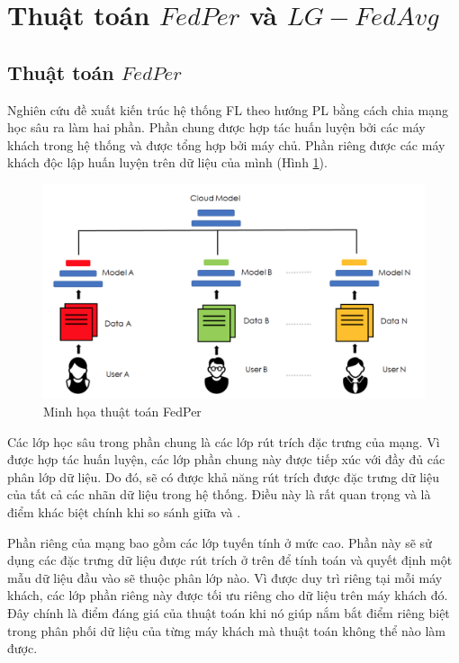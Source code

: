 \section{Thuật toán $FedPer$ và $LG-FedAvg$}


\subsection{Thuật toán $FedPer$}

Nghiên cứu \cite{arivazhagan2019federated} đề xuất kiến trúc hệ thống FL theo hướng PL bằng cách chia mạng học sâu ra làm hai phần. Phần chung được hợp tác huấn luyện bởi các máy khách trong hệ thống và được tổng hợp bởi máy chủ. Phần riêng được các máy khách độc lập huấn luyện trên dữ liệu của mình (Hình \ref{fig:fedper}).

\begin{figure}
    \centering
    \includegraphics[scale=0.8]{../images/perlayer.png}
    \caption{Minh họa thuật toán FedPer \cite{arivazhagan2019federated}}
    \label{fig:fedper}
\end{figure}

Các lớp học sâu trong phần chung là các lớp rút trích đặc trưng của mạng. Vì được hợp tác huấn luyện, các lớp phần chung này được tiếp xúc với đầy đủ các phân lớp dữ liệu. Do đó, sẽ có được khả năng rút trích được đặc trưng dữ liệu của tất cả các nhãn dữ liệu trong hệ thống. Điều này là rất quan trọng và là điểm khác biệt chính khi so sánh giữa  và .

Phần riêng của mạng bao gồm các lớp tuyến tính ở mức cao. Phần này sẽ sử dụng các đặc trưng dữ liệu được rút trích ở trên để tính toán và quyết định một mẫu dữ liệu đầu vào sẽ thuộc phân lớp nào. Vì được duy trì riêng tại mỗi máy khách, các lớp phần riêng này được tối ưu riêng cho dữ liệu trên máy khách đó. Đây chính là điểm đáng giá của thuật toán  khi nó giúp nắm bắt điểm riêng biệt trong phân phối dữ liệu của từng máy khách mà thuật toán  không thể nào làm được.

